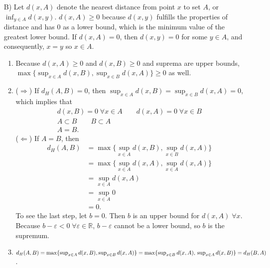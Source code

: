 \documentclass[a4paper,12pt]{article}
\begin{document}
\begin{enumerate}
        \item[B)]
            Let $d(x, A)$ denote the nearest distance from point $x$ to set $A$, or $\inf_{y \in A} d(x, y)$. $d(x, A) \geq 0$ because $d(x, y)$ fulfills the properties of distance and has $0$ as a lower bound, which is the minimum value of the greatest lower bound. If $d(x, A) = 0$, then $d(x, y) = 0$ for some $y \in A$, and consequently, $x = y$ so $x \in A$.
            \begin{enumerate}[label = (\roman*)]
                \item
                    Because $d(x, A) \geq 0$ and $d(x, B) \geq 0$ and suprema are upper bounds, \\
                    $\max\{ \sup_{x \in A} d(x, B), \sup_{x \in B} d(x, A) \} \geq 0$ as well.

                \item
                    ($\Rightarrow$) If $d_H(A, B) = 0$, then $\sup_{x \in A} d(x, B) = \sup_{x \in B} d(x, A) = 0$, which implies that
                    \begin{gather*}
                        d(x, B) = 0 \; \forall x \in A \qquad d(x, A) = 0 \; \forall x \in B \\
                        A \subset B \qquad B \subset A \\
                        A = B.
                    \end{gather*}
                    ($\Leftarrow$) If $A = B$, then
                    \begin{align*}
                        d_H(A, B) &= \max\{ \sup_{x \in A} d(x, B), \sup_{x \in B} d(x, A) \} \\
                        &= \max\{ \sup_{x \in A} d(x, A), \sup_{x \in A} d(x, A) \} \\
                        &= \sup_{x \in A} d(x, A) \\
                        &= \sup_{x \in A} 0 \\
                        &= 0.
                    \end{align*}
                    To see the last step, let $b = 0$. Then $b$ is an upper bound for $d(x, A) \; \forall x$. Because $b - \varepsilon < 0 \; \forall \varepsilon \in \mathbb{R}$, $b - \varepsilon$ cannot be a lower bound, so $b$ is the supremum.

                \item
                    $d_H(A, B) = \max\{ \sup_{x \in A} d(x, B), \sup_{x \in B} d(x, A) \} = \max\{ \sup_{x \in B} d(x, A), \\
                    \sup_{x \in A} d(x, B) \} = d_H(B, A)$.


\end{enumerate}
\end{enumerate}
\end{document}
